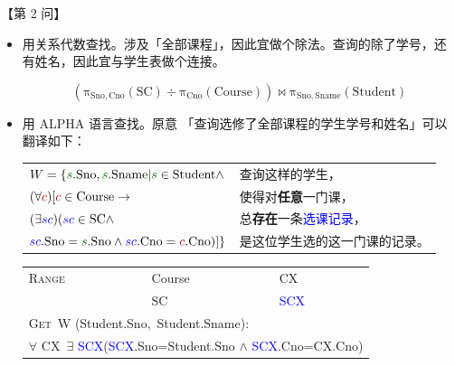 \documentclass[UTF8]{ctexart}
\newcommand\Emph[1]{\colorbox{green!10}{\textcolor{green!30!black}{#1}}}
\begin{document}
【第 2 问】
\begin{itemize}
    \item 用关系代数查找。涉及「全部课程」，因此宜做个\Emph{除法}。查询的除了学号，还有姓名，因此宜与学生表做个连接。

\begin{equation*}
    \mathrm{(\pi_{Sno,Cno}(SC)\div \pi_{Cno}(Course)) \bowtie \pi_{Sno,Sname}(Student)}
\end{equation*}

    \item 用 ALPHA 语言查找。原意 「查询选修了全部课程的学生学号和姓名」可以翻译如下：
    
    \begin{table}[htb]
    \newcommand\Student{\mathrm{Student}}
    \newcommand\Sno{\mathrm{Sno}}
    \newcommand\Cno{\mathrm{Cno}}
    \newcommand\Sname{\mathrm{Sname}}
    \newcommand\SC{\mathrm{SC}}
    \newcommand\Course{\mathrm{Course}}
    \renewcommand\sc{\textcolor{blue}{sc}}
    \newcommand\s{\textcolor{green!40!black}{s}}
    \renewcommand\c{\textcolor{red!70!black}{c}}
        \centering
        \begin{tabular}{ll}
          $W=\{\s.\Sno,\s.\Sname | \s\in \Student \wedge$  & 查询这样的\textcolor{green!40!black}{学生}，\\
           $(\forall \c) [\c\in \Course \to $ & 使得对\textbf{任意}一门\textcolor{red!70!black}{课}，\\
           $(\exists \sc) (\sc\in \SC \wedge $ & 总\textbf{存在}一条\textcolor{blue}{选课记录}，\\
           $\sc.\Sno=\s.\Sno \wedge \sc.\Cno=\c.\Cno )]\}$ & 是这位\textcolor{green!40!black}{学生}选的这一门\textcolor{red!70!black}{课}的记录。\\
        \end{tabular}
    \end{table}
    
    \begin{table}[htb]
    \newcommand\SCX{\textcolor{blue}{SCX}}
    \newcommand\Student{\textcolor{green!40!black}{Student}}
    \newcommand\CX{\textcolor{red!70!black}{CX}}  
        \centering
        \begin{tabular}{lll}
            \textsc{Range} & Course & \CX \\
            & SC & \SCX \\
            \multicolumn{3}{l}{\textsc{Get}\ W (\Student.Sno,\ \Student.Sname):} \\
            \multicolumn{3}{l}{\qquad $\forall$ \CX \ $\exists$ \SCX (\SCX.Sno=\Student.Sno $\wedge$ \SCX.Cno=\CX.Cno)}
        \end{tabular}
    \end{table}
    

\end{itemize}
\end{document}
